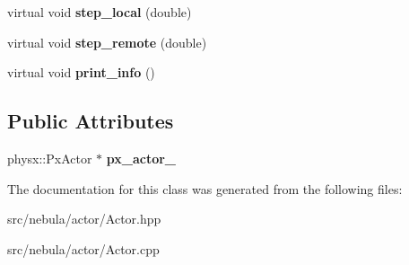 \begin{DoxyCompactItemize}
\item 
\hypertarget{classneb_1_1actor_1_1Actor_a04b545da670a47a37b152cfa3444767e}{
virtual void {\bfseries step\_\-local} (double)}
\label{classneb_1_1actor_1_1Actor_a04b545da670a47a37b152cfa3444767e}

\item 
\hypertarget{classneb_1_1actor_1_1Actor_a14f9a1b3e60bdad6ae4dfafd6f9580e8}{
virtual void {\bfseries step\_\-remote} (double)}
\label{classneb_1_1actor_1_1Actor_a14f9a1b3e60bdad6ae4dfafd6f9580e8}

\item 
\hypertarget{classneb_1_1actor_1_1Actor_ac1c1c4f015ed704b306d3aaa3fa3efc1}{
virtual void {\bfseries print\_\-info} ()}
\label{classneb_1_1actor_1_1Actor_ac1c1c4f015ed704b306d3aaa3fa3efc1}

\end{DoxyCompactItemize}
\subsection*{Public Attributes}
\begin{DoxyCompactItemize}
\item 
\hypertarget{classneb_1_1actor_1_1Actor_a5518293d3ea9acf46c4bd20c961f759f}{
physx::PxActor $\ast$ {\bfseries px\_\-actor\_\-}}
\label{classneb_1_1actor_1_1Actor_a5518293d3ea9acf46c4bd20c961f759f}

\end{DoxyCompactItemize}


The documentation for this class was generated from the following files:\begin{DoxyCompactItemize}
\item 
src/nebula/actor/Actor.hpp\item 
src/nebula/actor/Actor.cpp\end{DoxyCompactItemize}

